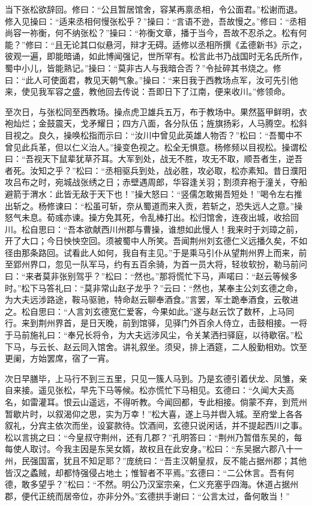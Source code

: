 当下张松欲辞回。修曰：“公且暂居馆舍，容某再禀丞相，令公面君。”松谢而退。修入见操曰：“适来丞相何慢张松乎？”操曰：“言语不逊，吾故慢之。”修曰：“丞相尚容一祢衡，何不纳张松？”操曰：“祢衡文章，播于当今，吾故不忍杀之。松有何能？”修曰：“且无论其口似悬河，辩才无碍。适修以丞相所撰《孟德新书》示之，彼观一遍，即能暗诵，如此博闻强记，世所罕有。松言此书乃战国时无名氏所作，蜀中小儿，皆能熟记。”操曰：“莫非古人与我暗合否？”令扯碎其书烧之。修曰：“此人可使面君，教见天朝气象。”操曰：“来日我于西教场点军，汝可先引他来，使见我军容之盛，教他回去传说：吾即日下了江南，便来收川。”修领命。

至次日，与张松同至西教场。操点虎卫雄兵五万，布于教场中。果然盔甲鲜明，衣袍灿烂；金鼓震天，戈矛耀日；四方八面，各分队伍；旌旗扬彩，人马腾空。松斜目视之。良久，操唤松指而示曰：“汝川中曾见此英雄人物否？”松曰：“吾蜀中不曾见此兵革，但以仁义治人。”操变色视之。松全无惧意。杨修频以目视松。操谓松曰：“吾视天下鼠辈犹草芥耳。大军到处，战无不胜，攻无不取，顺吾者生，逆吾者死。汝知之乎？”松曰：“丞相驱兵到处，战必胜，攻必取，松亦素知。昔日濮阳攻吕布之时，宛城战张绣之日；赤壁遇周郎，华容逢关羽；割须弃袍于潼关，夺船避箭于渭水：此皆无敌于天下也！”操大怒曰：“竖儒怎敢揭吾短处！”喝令左右推出斩之。杨修谏曰：“松虽可斩，奈从蜀道而来入贡，若斩之，恐失远人之意。”操怒气未息。荀彧亦谏。操方免其死，令乱棒打出。松归馆舍，连夜出城，收拾回川。松自思曰：“吾本欲献西川州郡与曹操，谁想如此慢人！我来时于刘璋之前，开了大口；今日怏怏空回。须被蜀中人所笑。吾闻荆州刘玄德仁义远播久矣，不如径由那条路回。试看此人如何，我自有主见。”于是乘马引仆从望荆州界上而来，前至郢州界口，忽见一队军马，约有五百余骑，为首一员大将，轻妆软扮，勒马前问曰：“来者莫非张别驾乎？”松曰：“然也。”那将慌忙下马，声喏曰：“赵云等候多时。”松下马答礼曰：“莫非常山赵子龙乎？”云曰：“然也，某奉主公刘玄德之命，为大夫远涉路途，鞍马驱驰，特命赵云聊奉酒食。”言罢，军士跪奉酒食，云敬进之。松自思曰：“人言刘玄德宽仁爱客，今果如此。”遂与赵云饮了数杯，上马同行。来到荆州界首，是日天晚，前到馆驿，见驿门外百余人侍立，击鼓相接。一将于马前施礼曰：“奉兄长将令，为大夫远涉风尘，令关某洒扫驿庭，以待歇宿。”松下马，与云长、赵云同入馆舍。讲礼叙坐。须臾，排上酒筵，二人殷勤相劝。饮至更阑，方始罢席，宿了一宵。

次日早膳毕，上马行不到三五里，只见一簇人马到。乃是玄德引着伏龙、凤雏，亲自来接。遥见张松，早先下马等候。松亦慌忙下马相见。玄德曰：“久闻大夫高名，如雷灌耳。恨云山遥远，不得听教。今闻回都，专此相接。倘蒙不弃，到荒州暂歇片时，以叙渴仰之思，实为万幸！”松大喜，遂上马并辔入城。至府堂上各各叙礼，分宾主依次而坐，设宴款待。饮酒间，玄德只说闲话，并不提起西川之事。松以言挑之曰：“今皇叔守荆州，还有几郡？”孔明答曰：“荆州乃暂借东吴的，每每使人取讨。今我主因是东吴女婿，故权且在此安身。”松曰：“东吴据六郡八十一州，民强国富，犹且不知足耶？”庞统曰：“吾主汉朝皇叔，反不能占据州郡；其他皆汉之蟊贼，却都恃强侵占地土；惟智者不平焉。”玄德曰：“二公休言。吾有何德，敢多望乎？”松曰：“不然。明公乃汉室宗亲，仁义充塞乎四海。休道占据州郡，便代正统而居帝位，亦非分外。”玄德拱手谢曰：“公言太过，备何敢当！”

